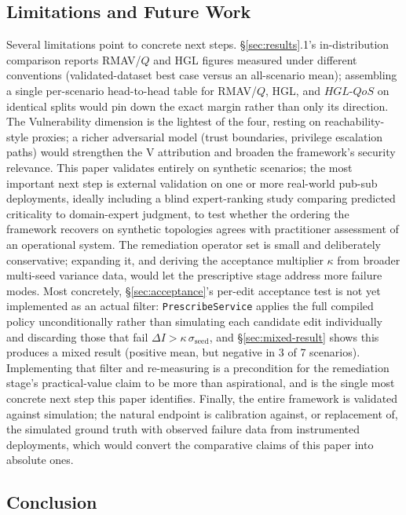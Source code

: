 \documentclass[review]{elsarticle}
\begin{document}
\subsection{Limitations and Future Work}
\label{sec:futurework}

Several limitations point to concrete next steps. \S\ref{sec:results}.1's in-distribution comparison
reports RMAV/$Q$ and HGL figures measured under different conventions (validated-dataset best case
versus an all-scenario mean); assembling a single per-scenario head-to-head table for RMAV/$Q$, HGL,
and $HGL\text{-}QoS$ on identical splits would pin down the exact margin rather than only its
direction. The Vulnerability dimension is the lightest of the four, resting on reachability-style
proxies; a richer adversarial model (trust boundaries, privilege escalation paths) would strengthen
the V attribution and broaden the framework's security relevance. This paper validates entirely on
synthetic scenarios; the most important next step is external validation on one or more real-world
pub-sub deployments, ideally including a blind expert-ranking study comparing predicted criticality
to domain-expert judgment, to test whether the ordering the framework recovers on synthetic
topologies agrees with practitioner assessment of an operational system. The remediation operator
set is small and deliberately conservative; expanding it, and deriving the acceptance multiplier
$\kappa$ from broader multi-seed variance data, would let the prescriptive stage address more failure
modes. Most concretely, \S\ref{sec:acceptance}'s per-edit acceptance test is not yet implemented as
an actual filter: \texttt{PrescribeService} applies the full compiled policy unconditionally rather
than simulating each candidate edit individually and discarding those that fail $\Delta I >
\kappa\,\sigma_{\text{seed}}$, and \S\ref{sec:mixed-result} shows this produces a mixed result
(positive mean, but negative in 3 of 7 scenarios). Implementing that filter and re-measuring is a
precondition for the remediation stage's practical-value claim to be more than aspirational, and is
the single most concrete next step this paper identifies. Finally, the entire framework is validated
against simulation; the natural endpoint is calibration against, or replacement of, the simulated
ground truth with observed failure data from instrumented deployments, which would convert the
comparative claims of this paper into absolute ones.

\subsection{Conclusion}
\end{document}
